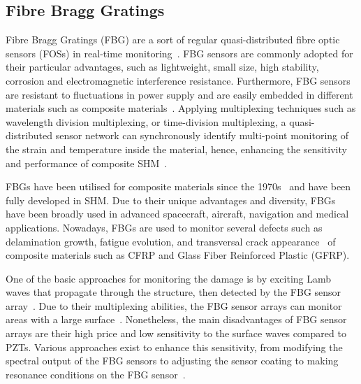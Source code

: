 \subsection{Fibre Bragg Gratings} 
Fibre Bragg Gratings (FBG) are a sort of regular quasi-distributed fibre optic sensors (FOSs) in real-time monitoring~\cite{Cai2012}.  
FBG sensors are commonly adopted for their particular advantages, such as lightweight, small size, high stability, corrosion and electromagnetic interference resistance. 
Furthermore, FBG sensors are resistant to fluctuations in power supply and are easily embedded in different materials such as composite materials~\cite{Jang2012}. 
Applying multiplexing techniques such as wavelength division multiplexing, or time-division multiplexing, a quasi-distributed sensor network can synchronously identify multi-point monitoring of the strain and temperature inside the material, hence, enhancing the sensitivity and performance of composite SHM~\cite{Jang2012}.

FBGs have been utilised for composite materials since the 1970s~\cite{othonos1999fiber} and have been fully developed in SHM. 
Due to their unique advantages and diversity, FBGs have been broadly used in advanced spacecraft, aircraft, navigation and medical applications. 
Nowadays, FBGs are used to monitor several defects such as delamination growth, fatigue evolution, and transversal crack appearance~\cite{Kinet2014, Guemes, SelimKocaman} of composite materials such as CFRP and Glass Fiber Reinforced Plastic (GFRP).

One of the basic approaches for monitoring the damage is by exciting Lamb waves that propagate through the structure, then detected by the FBG sensor array~\cite{Soman2021, Wee2021, Soman}. 
Due to their multiplexing abilities, the FBG sensor arrays can monitor areas with a large surface~\cite{Wee2017}. 
Nonetheless, the main disadvantages of FBG sensor arrays are their high price and low sensitivity to the surface waves compared to PZTs. 
Various approaches exist to enhance this sensitivity, from modifying the spectral output of the FBG sensors to adjusting the sensor coating to making resonance conditions on the FBG sensor~\cite{Wee2017}.
